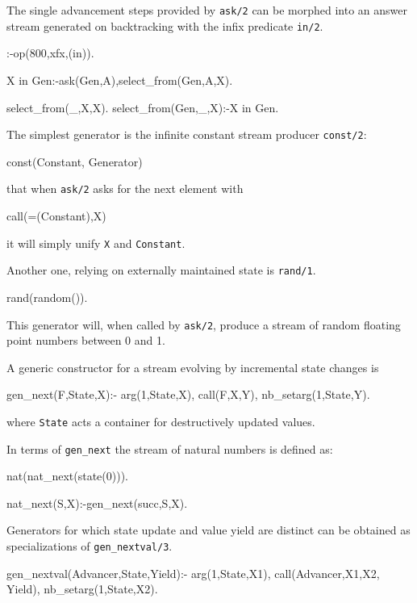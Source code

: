 \documentclass{new_tlp}
\begin{document}
The single advancement steps provided by {\tt ask/2} can be morphed into an answer stream generated on backtracking with the infix predicate {\tt in/2}.
\begin{code}
:-op(800,xfx,(in)).

X in Gen:-ask(Gen,A),select_from(Gen,A,X).

select_from(_,X,X).
select_from(Gen,_,X):-X in Gen.
\end{code}

The simplest generator is the infinite constant stream producer {\tt const/2}:
\begin{code}
const(Constant, Generator)
\end{code}
that when {\tt ask/2} asks for the next element with
\begin{codex}
call(=(Constant),X)
\end{codex}
it will simply unify {\tt X} and {\tt Constant}.

Another one, relying on externally maintained state is {\tt rand/1}.
\begin{code}
rand(random()).
\end{code}
This generator will, when called by {\tt ask/2}, produce a stream of random floating point numbers between 0 and 1.

A generic constructor for a stream evolving by incremental state changes is
\begin{code}
gen_next(F,State,X):-
  arg(1,State,X),
  call(F,X,Y),
  nb_setarg(1,State,Y).
\end{code}
where {\tt State} acts a container for destructively updated values.



In terms of {\tt gen\_next} the stream of natural numbers is defined as:
\begin{code}
nat(nat_next(state(0))).

nat_next(S,X):-gen_next(succ,S,X).
\end{code}

Generators for which state update and value yield are distinct
can be obtained as specializations of {\tt gen\_nextval/3}.
\begin{code}
gen_nextval(Advancer,State,Yield):-
  arg(1,State,X1),
  call(Advancer,X1,X2, Yield),
  nb_setarg(1,State,X2).
\end{code}
\end{document}
